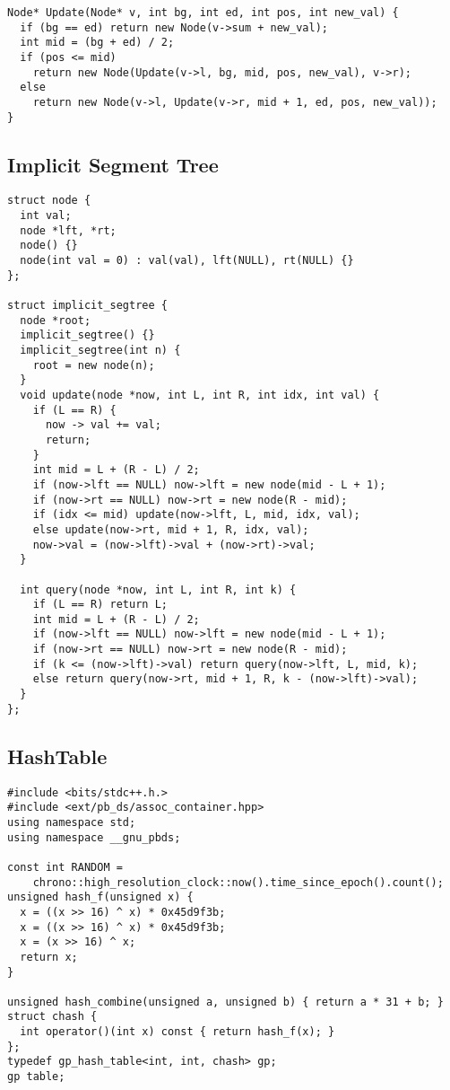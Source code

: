 \documentclass[FSZ,a4paper,onesided]{article}
\begin{document}
\begin{multicols*}{\COLS}
\begin{lstlisting}
Node* Update(Node* v, int bg, int ed, int pos, int new_val) {
  if (bg == ed) return new Node(v->sum + new_val);
  int mid = (bg + ed) / 2;
  if (pos <= mid)
    return new Node(Update(v->l, bg, mid, pos, new_val), v->r);
  else
    return new Node(v->l, Update(v->r, mid + 1, ed, pos, new_val));
}
\end{lstlisting}
\subsection{Implicit Segment Tree}
\begin{lstlisting}
struct node {
  int val;
  node *lft, *rt;
  node() {}
  node(int val = 0) : val(val), lft(NULL), rt(NULL) {}
};

struct implicit_segtree {
  node *root;
  implicit_segtree() {}
  implicit_segtree(int n) {
    root = new node(n);
  }
  void update(node *now, int L, int R, int idx, int val) {
    if (L == R) {
      now -> val += val;
      return;
    }
    int mid = L + (R - L) / 2;
    if (now->lft == NULL) now->lft = new node(mid - L + 1);
    if (now->rt == NULL) now->rt = new node(R - mid);
    if (idx <= mid) update(now->lft, L, mid, idx, val);
    else update(now->rt, mid + 1, R, idx, val);
    now->val = (now->lft)->val + (now->rt)->val;
  }

  int query(node *now, int L, int R, int k) {
    if (L == R) return L;
    int mid = L + (R - L) / 2;
    if (now->lft == NULL) now->lft = new node(mid - L + 1);
    if (now->rt == NULL) now->rt = new node(R - mid);
    if (k <= (now->lft)->val) return query(now->lft, L, mid, k);
    else return query(now->rt, mid + 1, R, k - (now->lft)->val);
  }
};
\end{lstlisting}
\subsection{HashTable}
\begin{lstlisting}
#include <bits/stdc++.h.>
#include <ext/pb_ds/assoc_container.hpp>
using namespace std;
using namespace __gnu_pbds;

const int RANDOM =
    chrono::high_resolution_clock::now().time_since_epoch().count();
unsigned hash_f(unsigned x) {
  x = ((x >> 16) ^ x) * 0x45d9f3b;
  x = ((x >> 16) ^ x) * 0x45d9f3b;
  x = (x >> 16) ^ x;
  return x;
}

unsigned hash_combine(unsigned a, unsigned b) { return a * 31 + b; }
struct chash {
  int operator()(int x) const { return hash_f(x); }
};
typedef gp_hash_table<int, int, chash> gp;
gp table;
\end{lstlisting}

\end{multicols*}
\end{document}

